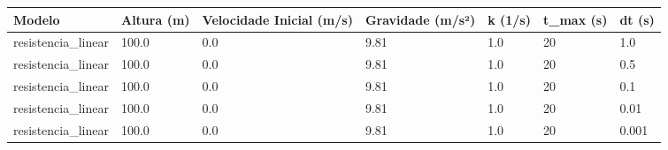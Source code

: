\begin{tabular}{lllllll}
\toprule
Modelo & Altura (m) & Velocidade Inicial (m/s) & Gravidade (m/s²) & k (1/s) & t\_max (s) & dt (s) \\
\midrule
resistencia\_linear & 100.0 & 0.0 & 9.81 & 1.0 & 20 & 1.0 \\
resistencia\_linear & 100.0 & 0.0 & 9.81 & 1.0 & 20 & 0.5 \\
resistencia\_linear & 100.0 & 0.0 & 9.81 & 1.0 & 20 & 0.1 \\
resistencia\_linear & 100.0 & 0.0 & 9.81 & 1.0 & 20 & 0.01 \\
resistencia\_linear & 100.0 & 0.0 & 9.81 & 1.0 & 20 & 0.001 \\
\bottomrule
\end{tabular}
